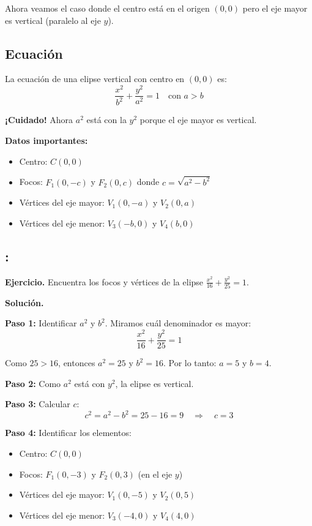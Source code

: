 \documentclass[12pt,a4paper]{article}
\begin{document}
	Ahora veamos el caso donde el centro está en el origen $(0,0)$ pero el eje mayor es vertical (paralelo al eje $y$).

	\subsection*{Ecuación}

	La ecuación de una elipse vertical con centro en $(0,0)$ es:
	\[
	\boxed{\frac{x^2}{b^2}+\frac{y^2}{a^2}=1} \quad\text{con }a>b
	\]

	\textbf{¡Cuidado!} Ahora $a^2$ está con la $y^2$ porque el eje mayor es vertical.

	\textbf{Datos importantes:}
	\begin{itemize}
		\item Centro: $C(0,0)$
		\item Focos: $F_1(0,-c)$ y $F_2(0,c)$ donde $c=\sqrt{a^2-b^2}$
		\item Vértices del eje mayor: $V_1(0,-a)$ y $V_2(0,a)$
		\item Vértices del eje menor: $V_3(-b,0)$ y $V_4(b,0)$
	\end{itemize}

	\subsection*{{\color{blue!40!red}{Ejemplo 2}}: \color{blue!80!black}{Elipse vertical con centro en el origen}}

	\textbf{Ejercicio.} Encuentra los focos y vértices de la elipse $\displaystyle\frac{x^2}{16}+\frac{y^2}{25}=1$.

	\bigskip

	\textbf{Solución.}

	\bigskip

	\textbf{Paso 1:} Identificar $a^2$ y $b^2$. Miramos cuál denominador es mayor:
	\[
	\frac{x^2}{16}+\frac{y^2}{25}=1
	\]

	Como $25>16$, entonces $a^2=25$ y $b^2=16$. Por lo tanto: $a=5$ y $b=4$.

	\textbf{Paso 2:} Como $a^2$ está con $y^2$, la elipse es vertical.

	\textbf{Paso 3:} Calcular $c$:
	\[
	c^2=a^2-b^2=25-16=9 \quad\Rightarrow\quad c=3
	\]

	\textbf{Paso 4:} Identificar los elementos:
	\begin{itemize}
		\item Centro: $\boxed{C(0,0)}$
		\item Focos: $\boxed{F_1(0,-3)\text{ y }F_2(0,3)}$ (en el eje $y$)
		\item Vértices del eje mayor: $\boxed{V_1(0,-5)\text{ y }V_2(0,5)}$
		\item Vértices del eje menor: $\boxed{V_3(-4,0)\text{ y }V_4(4,0)}$
	\end{itemize}
\end{document}
